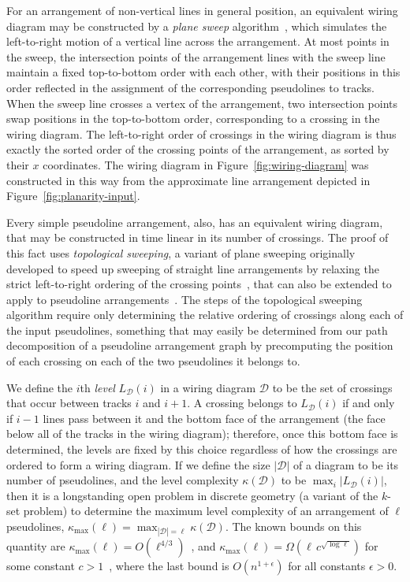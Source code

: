 \documentclass[oribibl]{llncs}
\newcommand{\klevel}{\kappa}
\newcommand{\maxklevel}{\kappa_{\max}}
\begin{document}
For an arrangement of non-vertical lines in general position, an equivalent wiring diagram may be constructed by a \emph{plane sweep} algorithm~\cite{BenOtt-IEEETC-79}, which simulates the left-to-right motion of a vertical line across the arrangement. At most points in the sweep, the intersection points of the arrangement lines with the sweep line maintain a fixed top-to-bottom order with each other, with their positions in this order reflected in the assignment of the corresponding pseudolines to tracks. When the sweep line crosses a vertex of the arrangement, two intersection points swap positions in the top-to-bottom order, corresponding to a crossing in the wiring diagram. The left-to-right order of crossings in the wiring diagram is thus exactly the sorted order of the crossing points of the arrangement, as sorted by their $x$ coordinates. The wiring diagram in Figure~\ref{fig:wiring-diagram} was constructed in this way from the approximate line arrangement depicted in Figure~\ref{fig:planarity-input}.

Every simple pseudoline arrangement, also, has an equivalent wiring diagram, that may be constructed in time linear in its number of crossings. The proof of this fact uses \emph{topological sweeping}, a variant of  plane sweeping originally developed to speed up sweeping of straight line arrangements by relaxing the strict left-to-right ordering of the crossing points~\cite{EdeGui-JCSS-89}, that can also be extended to apply to pseudoline arrangements~\cite{SnoHer-SCG-89}. The steps of the topological sweeping algorithm require only determining the relative ordering of crossings along each of the input pseudolines, something that may easily be determined from our path decomposition of a pseudoline arrangement graph by precomputing the position of each crossing on each of the two pseudolines it belongs to.

We define the $i$th \emph{level} $L_{\mathcal D}(i)$ in a wiring diagram $\mathcal D$ to be the set of crossings that occur between tracks $i$ and $i+1$. A crossing belongs to $L_{\mathcal D}(i)$ if and only if $i-1$ lines pass between it and the bottom face of the arrangement (the face below all of the tracks in the wiring diagram); therefore, once this bottom face is determined, the levels are fixed by this choice regardless of how the crossings are ordered to form a wiring diagram. If we define the size $|{\mathcal D}|$ of a diagram to be its number of pseudolines, and the level complexity $\klevel({\mathcal D})$ to be $\max_i |L_{\mathcal D}(i)|$, then it is a longstanding open problem in discrete geometry (a variant of the $k$-set problem) to determine the maximum level complexity of an arrangement of $\ell$ pseudolines,
$\maxklevel(\ell)=\max_{|{\mathcal D}|=\ell} \klevel({\mathcal D})$.
The known bounds on this quantity are
$\maxklevel(\ell)=O(\ell^{4/3})$~\cite{Dey-DCG-98,TamTok-Algo-03,ShaSmo-WADS-03},
and
$\maxklevel(\ell)=\Omega(\ell\,c^{\sqrt{\log\ell}})$ for some constant $c>1$~\cite{KlaPatPip-82,Tot-DCG-01},
where the last bound is $O(n^{1+\epsilon})$ for all constants $\epsilon>0$.
\end{document}
